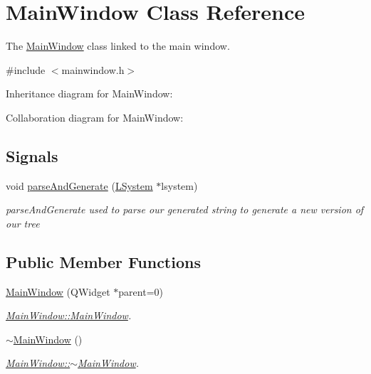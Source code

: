 \hypertarget{classMainWindow}{}\section{Main\+Window Class Reference}
\label{classMainWindow}


The \hyperlink{classMainWindow}{Main\+Window} class linked to the main window.  




{\ttfamily \#include $<$mainwindow.\+h$>$}



Inheritance diagram for Main\+Window\+:


Collaboration diagram for Main\+Window\+:
\subsection*{Signals}
\begin{DoxyCompactItemize}
\item 
void \hyperlink{classMainWindow_ae5c8940ac8e440ba3a5523d6ba149938}{parse\+And\+Generate} (\hyperlink{classLSystem}{L\+System} $\ast$lsystem)
\begin{DoxyCompactList}\small\item\em parse\+And\+Generate used to parse our generated string to generate a new version of our tree \end{DoxyCompactList}\end{DoxyCompactItemize}
\subsection*{Public Member Functions}
\begin{DoxyCompactItemize}
\item 
\hyperlink{classMainWindow_a8b244be8b7b7db1b08de2a2acb9409db}{Main\+Window} (Q\+Widget $\ast$parent=0)
\begin{DoxyCompactList}\small\item\em \hyperlink{classMainWindow_a8b244be8b7b7db1b08de2a2acb9409db}{Main\+Window\+::\+Main\+Window}. \end{DoxyCompactList}\item 
\mbox{\label{classMainWindow_ae98d00a93bc118200eeef9f9bba1dba7}} 
\hyperlink{classMainWindow_ae98d00a93bc118200eeef9f9bba1dba7}{$\sim$\+Main\+Window} ()
\begin{DoxyCompactList}\small\item\em \hyperlink{classMainWindow_ae98d00a93bc118200eeef9f9bba1dba7}{Main\+Window\+::$\sim$\+Main\+Window}. \end{DoxyCompactList}\end{DoxyCompactItemize}
